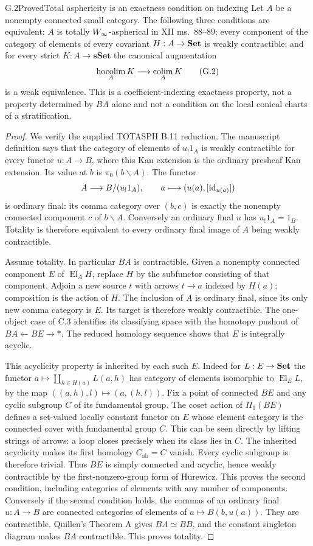 \begin{statement}{G.2}{Proved}{Total asphericity is an exactness condition on indexing}
Let $A$ be a nonempty connected small category. The following three
conditions are equivalent: $A$ is totally $W_{\infty}$-aspherical in XII
ms.~88--89; every component of the category of elements of every
covariant $H:A\to\mathbf{Set}$ is weakly contractible; and for every strict
$K:A\to\mathbf{sSet}$ the canonical augmentation
\[
 \operatorname*{hocolim}_AK\longrightarrow\operatorname*{colim}_AK
\tag{G.2}
\]
is a weak equivalence. This is a coefficient-indexing exactness property,
not a property determined by $BA$ alone and not a condition on the local
conical charts of a stratification.
\end{statement}
\begin{proof}
We verify the supplied TOTASPH B.11 reduction. The manuscript definition
says that the category of elements of $u_!1_A$ is weakly contractible for
every functor $u:A\to B$, where this Kan extension is the ordinary
presheaf Kan extension. Its value at $b$ is
$\pi_0(b\backslash A)$. The functor
\[
 A\longrightarrow B/(u_!1_A),\qquad
 a\longmapsto(u(a),[\mathrm{id}_{u(a)}])
\]
is ordinary final: its comma category over $(b,c)$ is exactly the
nonempty connected component $c$ of $b\backslash A$. Conversely an
ordinary final $u$ has $u_!1_A=1_B$. Totality is therefore equivalent to
every ordinary final image of $A$ being weakly contractible.

Assume totality. In particular $BA$ is contractible. Given a nonempty
connected component $E$ of $\operatorname{El}_A H$, replace $H$ by the
subfunctor consisting of that component. Adjoin a new source $t$ with
arrows $t\to a$ indexed by $H(a)$; composition is the action of $H$.
The inclusion of $A$ is ordinary final, since its only new comma
category is $E$. Its target is therefore weakly contractible. The
one-object case of C.3 identifies its classifying space with the
homotopy pushout of $BA\leftarrow BE\to *$. The reduced homology
sequence shows that $E$ is integrally acyclic.

This acyclicity property is inherited by each such $E$. Indeed for
$L:E\to\mathbf{Set}$ the functor
$a\mapsto\coprod_{h\in H(a)}L(a,h)$ has category of elements
isomorphic to $\operatorname{El}_E L$, by the map
$((a,h),l)\mapsto(a,(h,l))$. Fix a point of connected $BE$ and any
cyclic subgroup $C$ of its fundamental group. The coset action of
$\Pi_1(BE)$ defines a set-valued locally constant functor on $E$ whose
element category is the connected cover with fundamental group $C$.
This can be seen directly by lifting strings of arrows: a loop closes
precisely when its class lies in $C$. The inherited acyclicity makes its
first homology $C_{\mathrm{ab}}=C$ vanish. Every cyclic subgroup is
therefore trivial. Thus $BE$ is simply connected and acyclic, hence
weakly contractible by the first-nonzero-group form of Hurewicz. This
proves the second condition, including categories of elements with any
number of components. Conversely if the second condition holds, the
commas of an ordinary final $u:A\to B$ are connected categories of
elements of $a\mapsto B(b,u(a))$. They are contractible. Quillen's
Theorem A gives $BA\simeq BB$, and the constant singleton diagram makes
$BA$ contractible. This proves totality.


\end{proof}
